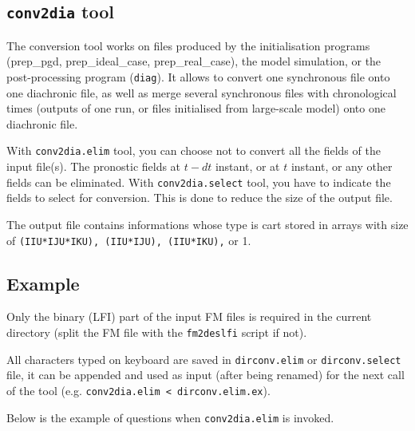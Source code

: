 \subsection{{\tt conv2dia} tool}
The conversion tool works on files produced by
the initialisation programs ({\sc prep\_pgd, prep\_ideal\_case,
prep\_real\_case}), the model simulation, or the post-processing program
({\tt\sc diag}). It allows to convert one synchronous file onto one diachronic 
file, as well as merge several synchronous files with chronological times
(outputs of one run, or files initialised from large-scale model)
onto one diachronic file.

With {\tt conv2dia.elim} tool, you can choose not to convert all the fields of
the input file(s). The pronostic fields at $t-dt$ instant, or at $t$ instant,
or any other fields can be eliminated.
With {\tt conv2dia.select} tool, you have to indicate the fields to select
for conversion.
This is done to reduce the size of the output file.

The output file contains informations whose type is {\sc cart} stored in arrays
with size of {\tt (IIU*IJU*IKU), (IIU*IJU), (IIU*IKU),} or 1.


\subsection{Example}

Only the binary (\textsc{LFI}) part of the input FM files is required
in the current directory (split the FM file with the {\tt fm2deslfi} 
script if not).

All characters typed on keyboard are saved in {\tt dirconv.elim} or 
{\tt dirconv.select} file, it can be appended and used as input (after being 
renamed) for the next call of the tool
\newline (e.g.  {\tt conv2dia.elim < dirconv.elim.ex}).

Below is the example of questions when {\tt conv2dia.elim} is invoked.

